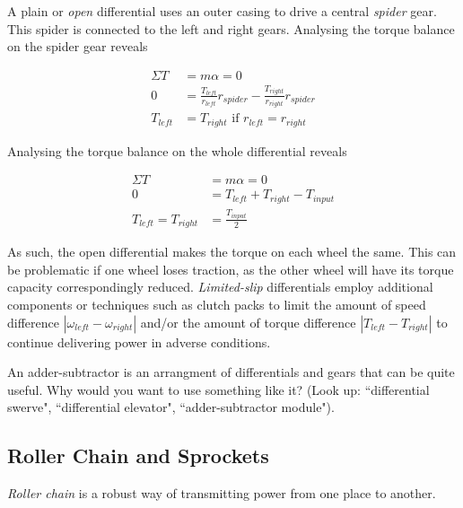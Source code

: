 A plain or \textit{open} differential uses an outer casing to drive a central \textit{spider} gear. This spider is connected to the left and right gears. Analysing the torque balance on the spider gear reveals

\begin{align}
	\Sigma T &= m \alpha = 0 \nonumber \\
	0 &= \frac{T_{left}}{r_{left}} r_{spider} - \frac{T_{right}}{r_{right}} r_{spider}  \nonumber \\
	T_{left} &= T_{right} \text{ if } r_{left} = r_{right}
\end{align}

Analysing the torque balance on the whole differential reveals

\begin{align}
	\Sigma T &= m \alpha = 0 \nonumber \\
	0 &= T_{left} + T_{right} - T_{input} \nonumber \\
	T_{left} = T_{right} &= \frac{T_{input}}{2}
\end{align}

As such, the open differential makes the torque on each wheel the same. This can be problematic if one wheel loses traction, as the other wheel will have its torque capacity correspondingly reduced.  \textit{Limited-slip} differentials employ additional components or techniques such as clutch packs to limit the amount of speed difference $|\omega_{left} - \omega_{right}|$ and/or the amount of torque difference $|T_{left} - T_{right}|$ to continue delivering power in adverse conditions. 

\begin{qbox}
	An adder-subtractor is an arrangment of differentials and gears that can be quite useful. Why would you want to use something like it? (Look up: ``differential swerve", ``differential elevator", ``adder-subtractor module").
\end{qbox}	

\newpage

\subsection{Roller Chain and Sprockets}

\textit{Roller chain} is a robust way of transmitting power from one place to another. 

